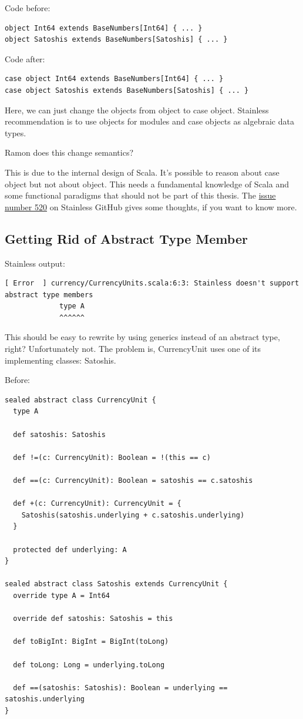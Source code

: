 \documentclass[runningheads]{llncs}
\newcommand{\todo}[1]{{\par \color{red}#1}}
\begin{document}
Code before:
\begin{lstlisting}[style=scala]
object Int64 extends BaseNumbers[Int64] { ... }
object Satoshis extends BaseNumbers[Satoshis] { ... }
\end{lstlisting}

Code after:
\begin{lstlisting}[style=scala]
case object Int64 extends BaseNumbers[Int64] { ... }
case object Satoshis extends BaseNumbers[Satoshis] { ... }
\end{lstlisting}

Here, we can just change the objects from object to case object.
Stainless recommendation is to use objects for modules and case objects as algebraic data types.

\todo{Ramon does this change semantics?}

This is due to the internal design of Scala.
It's possible to reason about case object but not about object.
This needs a fundamental knowledge of Scala and some functional paradigms that should not be part of this thesis.
The \href{https://github.com/epfl-lara/stainless/issues/520}{issue number 520} on Stainless GitHub gives some thoughts, if you want to know more.


\subsection{Getting Rid of Abstract Type Member}

Stainless output:
\begin{lstlisting}[style=stainless]
  [ Error  ] currency/CurrencyUnits.scala:6:3: Stainless doesn't support abstract type members
             type A
             ^^^^^^
\end{lstlisting}

This should be easy to rewrite by using generics instead of an abstract type, right?
Unfortunately not.
The problem is, CurrencyUnit uses one of its implementing classes: Satoshis.

Before:
\begin{lstlisting}[style=scala]
sealed abstract class CurrencyUnit {
  type A

  def satoshis: Satoshis

  def !=(c: CurrencyUnit): Boolean = !(this == c)

  def ==(c: CurrencyUnit): Boolean = satoshis == c.satoshis

  def +(c: CurrencyUnit): CurrencyUnit = {
    Satoshis(satoshis.underlying + c.satoshis.underlying)
  }

  protected def underlying: A
}

sealed abstract class Satoshis extends CurrencyUnit {
  override type A = Int64

  override def satoshis: Satoshis = this

  def toBigInt: BigInt = BigInt(toLong)

  def toLong: Long = underlying.toLong

  def ==(satoshis: Satoshis): Boolean = underlying == satoshis.underlying
}
\end{lstlisting}
\end{document}
